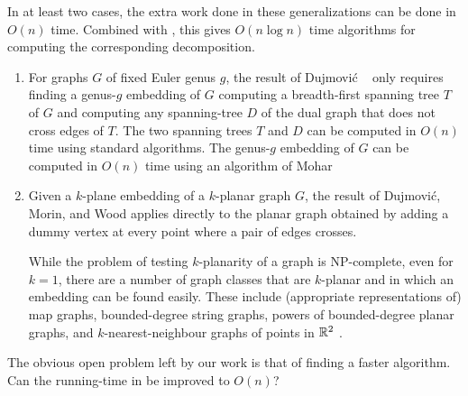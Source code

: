 \documentclass[kpfonts]{patmorin}
\begin{document}
In at least two cases, the extra work done in these generalizations can be done in $O(n)$ time.  Combined with , this gives $O(n\log n)$ time algorithms for computing the corresponding decomposition.
\begin{enumerate}
  \item For graphs $G$ of fixed Euler genus $g$, the result of Dujmović \etal\ \cite{dujmovic.joret.ea:planar} only requires finding a genus-$g$ embedding of $G$ computing a breadth-first spanning tree $T$ of $G$ and computing any spanning-tree $D$ of the dual graph that does not cross edges of $T$.  The two spanning trees $T$ and $D$ can be computed in $O(n)$ time using standard algorithms.  The genus-$g$ embedding of $G$ can be computed in $O(n)$ time using an algorithm of Mohar \cite{mohar:linear}

  \item Given a $k$-plane embedding of a $k$-planar graph $G$, the result of Dujmović, Morin, and Wood \cite{dujmovic.morin.ea:structure} applies  directly to the planar graph obtained by adding a dummy vertex at every point where a pair of edges crosses.

  While the problem of testing $k$-planarity of a graph is NP-complete, even for $k=1$, there are a number of graph classes that are $k$-planar and in which an embedding can be found easily.  These include (appropriate representations of) map graphs, bounded-degree string graphs, powers of bounded-degree planar graphs, and $k$-nearest-neighbour graphs of points in $\mathbb{R}^2$ \cite[Section~8]{dujmovic.morin.ea:structure}.
\end{enumerate}

The obvious open problem left by our work is that of finding a faster algorithm.  Can the running-time in  be improved to $O(n)$?




\end{document}
